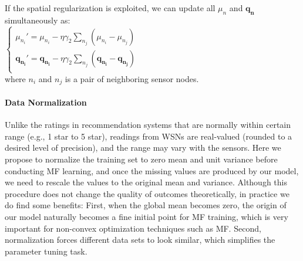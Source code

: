 If the spatial regularization is exploited, we can update all $\mu_n$ and $\mathbf{q_n}$ simultaneously as:\\
\indent $\begin{cases}
	\mu_{n_i}' = \mu_{n_i} - \eta \gamma_2 \sum_{n_j}{(\mu_{n_i} - \mu_{n_j})}\\
	\mathbf{q_{n_i}}' = \mathbf{q_{n_i}} - \eta \gamma_2 \sum_{n_j}{(\mathbf{q_{n_i}} - \mathbf{q_{n_j}})}\\
	\end{cases}$\\
where $n_i$ and $n_j$ is a pair of neighboring sensor nodes.

\paragraph*{Data Normalization}
Unlike the ratings in recommendation systems that are normally within certain range (e.g., 1 star to 5 star), readings from WSNs are real-valued (rounded to a desired level of precision), and the range may vary with the sensors.
Here we propose to normalize the training set to zero mean and unit variance before conducting MF learning, and once the missing values are produced by our model, we need to rescale the values to the original mean and variance.
Although this procedure does not change the quality of outcomes theoretically, in practice we do find some benefits: 
First, when the global mean becomes zero, the origin of our model naturally becomes a fine initial point for MF training, which is very important for non-convex optimization techniques such as MF.
Second, normalization forces different data sets to look similar, which simplifies the parameter tuning task. 


